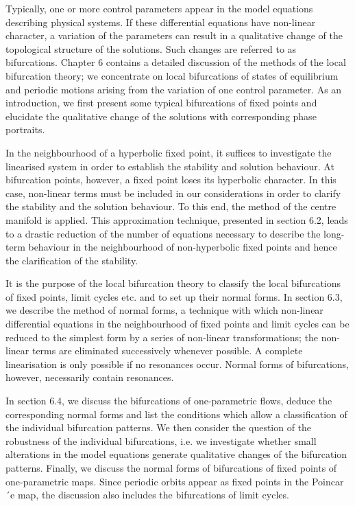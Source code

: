 \documentclass[12pt]{article}
\begin{document}
Typically, one or more control parameters appear in the model equations describing
physical systems. If these differential equations have non-linear character, a variation
of the parameters can result in a qualitative change of the topological structure
of the solutions. Such changes are referred to as bifurcations. Chapter 6 contains a
detailed discussion of the methods of the local bifurcation theory; we concentrate
on local bifurcations of states of equilibrium and periodic motions arising from the
variation of one control parameter. As an introduction, we first present some typical
bifurcations of fixed points and elucidate the qualitative change of the solutions
with corresponding phase portraits.

\hfill

In the neighbourhood of a hyperbolic fixed point, it suffices to investigate the linearised
system in order to establish the stability and solution behaviour. At bifurcation
points, however, a fixed point loses its hyperbolic character. In this case,
non-linear terms must be included in our considerations in order to clarify the stability
and the solution behaviour. To this end, the method of the centre manifold is
applied. This approximation technique, presented in section 6.2, leads to a drastic
reduction of the number of equations necessary to describe the long-term behaviour
in the neighbourhood of non-hyperbolic fixed points and hence the clarification of
the stability.

\hfill

It is the purpose of the local bifurcation theory to classify the local bifurcations of
fixed points, limit cycles etc. and to set up their normal forms. In section 6.3, we
describe the method of normal forms, a technique with which non-linear differential
equations in the neighbourhood of fixed points and limit cycles can be reduced to
the simplest form by a series of non-linear transformations; the non-linear terms are
eliminated successively whenever possible. A complete linearisation is only possible
if no resonances occur. Normal forms of bifurcations, however, necessarily contain
resonances.

\hfill

In section 6.4, we discuss the bifurcations of one-parametric flows, deduce the corresponding
normal forms and list the conditions which allow a classification of the
individual bifurcation patterns. We then consider the question of the robustness
of the individual bifurcations, i.e. we investigate whether small alterations in the
model equations generate qualitative changes of the bifurcation patterns. Finally,
we discuss the normal forms of bifurcations of fixed points of one-parametric maps.
Since periodic orbits appear as fixed points in the Poincar´e map, the discussion also
includes the bifurcations of limit cycles.
\end{document}

